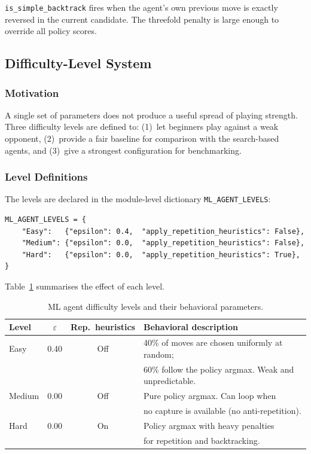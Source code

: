\texttt{is\_simple\_backtrack} fires when the agent's own previous move
is exactly reversed in the current candidate.  The threefold penalty is
large enough to override all policy scores.

\subsection{Difficulty-Level System}
\label{sec:levels}

\subsubsection{Motivation}

A single set of parameters does not produce a useful spread of
playing strength.  Three difficulty levels are defined to: (1)~let
beginners play against a weak opponent, (2)~provide a fair baseline
for comparison with the search-based agents, and (3)~give a strongest
configuration for benchmarking.

\subsubsection{Level Definitions}

The levels are declared in the module-level dictionary
\texttt{ML\_AGENT\_LEVELS}:

\begin{lstlisting}[caption={ML agent level configuration}]
ML_AGENT_LEVELS = {
    "Easy":   {"epsilon": 0.4,  "apply_repetition_heuristics": False},
    "Medium": {"epsilon": 0.0,  "apply_repetition_heuristics": False},
    "Hard":   {"epsilon": 0.0,  "apply_repetition_heuristics": True},
}
\end{lstlisting}

Table~\ref{tab:levels} summarises the effect of each level.

\begin{table}[H]
\centering
\caption{ML agent difficulty levels and their behavioral parameters.}
\label{tab:levels}
\begin{tabular}{lccl}
\toprule
\textbf{Level} & \textbf{$\varepsilon$} &
\textbf{Rep.\ heuristics} & \textbf{Behavioral description} \\
\midrule
Easy   & 0.40 & Off &
  40\% of moves are chosen uniformly at random; \\
  & & & 60\% follow the policy argmax.
  Weak and unpredictable. \\[3pt]
Medium & 0.00 & Off &
  Pure policy argmax.  Can loop when \\
  & & & no capture is available (no anti-repetition). \\[3pt]
Hard   & 0.00 & On  &
  Policy argmax with heavy penalties \\
  & & & for repetition and backtracking. \\
\bottomrule
\end{tabular}
\end{table}


